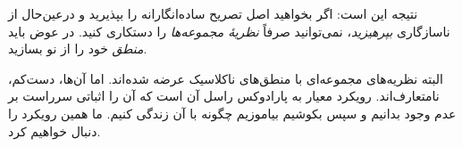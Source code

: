 \documentclass[../../../include/open-logic-section]{subfiles}
\begin{document}
نتیجه این است: اگر بخواهید اصل تصریح ساده‌انگارانه را بپذیرید و درعین‌حال
از ناسازگاری \emph{بپرهیزید}، نمی‌توانید صرفاً \emph{نظریهٔ مجموعه‌ها}
را دستکاری کنید. در عوض باید \emph{منطق} خود را از نو بسازید.

البته نظریه‌های مجموعه‌ای با منطق‌های ناکلاسیک عرضه شده‌اند. اما آن‌ها،
دست‌کم، نامتعارف‌اند. رویکرد معیار به پارادوکس راسل آن است که آن را
اثباتی سرراست بر عدم وجود بدانیم و سپس بکوشیم بیاموزیم چگونه با آن
زندگی کنیم. ما همین رویکرد را دنبال خواهیم کرد.
\end{document}
